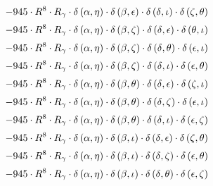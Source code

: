 \begin{subequations}
\begin{gather}
 \\[0.2em] \notag 		 - 945 \cdot R^{8} \cdot R_{\gamma{}} \cdot \delta{}\left(\alpha{}, \eta{}\right) \cdot \delta{}\left(\beta{}, \epsilon{}\right) \cdot \delta{}\left(\delta{}, \iota{}\right) \cdot \delta{}\left(\zeta{}, \theta{}\right) 
 \\[0.2em] \notag 		 - 945 \cdot R^{8} \cdot R_{\gamma{}} \cdot \delta{}\left(\alpha{}, \eta{}\right) \cdot \delta{}\left(\beta{}, \zeta{}\right) \cdot \delta{}\left(\delta{}, \epsilon{}\right) \cdot \delta{}\left(\theta{}, \iota{}\right) 
 \\[0.2em] \notag 		 - 945 \cdot R^{8} \cdot R_{\gamma{}} \cdot \delta{}\left(\alpha{}, \eta{}\right) \cdot \delta{}\left(\beta{}, \zeta{}\right) \cdot \delta{}\left(\delta{}, \theta{}\right) \cdot \delta{}\left(\epsilon{}, \iota{}\right) 
 \\[0.2em] \notag 		 - 945 \cdot R^{8} \cdot R_{\gamma{}} \cdot \delta{}\left(\alpha{}, \eta{}\right) \cdot \delta{}\left(\beta{}, \zeta{}\right) \cdot \delta{}\left(\delta{}, \iota{}\right) \cdot \delta{}\left(\epsilon{}, \theta{}\right) 
 \\[0.2em] \notag 		 - 945 \cdot R^{8} \cdot R_{\gamma{}} \cdot \delta{}\left(\alpha{}, \eta{}\right) \cdot \delta{}\left(\beta{}, \theta{}\right) \cdot \delta{}\left(\delta{}, \epsilon{}\right) \cdot \delta{}\left(\zeta{}, \iota{}\right) 
 \\[0.2em] \notag 		 - 945 \cdot R^{8} \cdot R_{\gamma{}} \cdot \delta{}\left(\alpha{}, \eta{}\right) \cdot \delta{}\left(\beta{}, \theta{}\right) \cdot \delta{}\left(\delta{}, \zeta{}\right) \cdot \delta{}\left(\epsilon{}, \iota{}\right) 
 \\[0.2em] \notag 		 - 945 \cdot R^{8} \cdot R_{\gamma{}} \cdot \delta{}\left(\alpha{}, \eta{}\right) \cdot \delta{}\left(\beta{}, \theta{}\right) \cdot \delta{}\left(\delta{}, \iota{}\right) \cdot \delta{}\left(\epsilon{}, \zeta{}\right) 
 \\[0.2em] \notag 		 - 945 \cdot R^{8} \cdot R_{\gamma{}} \cdot \delta{}\left(\alpha{}, \eta{}\right) \cdot \delta{}\left(\beta{}, \iota{}\right) \cdot \delta{}\left(\delta{}, \epsilon{}\right) \cdot \delta{}\left(\zeta{}, \theta{}\right) 
 \\[0.2em] \notag 		 - 945 \cdot R^{8} \cdot R_{\gamma{}} \cdot \delta{}\left(\alpha{}, \eta{}\right) \cdot \delta{}\left(\beta{}, \iota{}\right) \cdot \delta{}\left(\delta{}, \zeta{}\right) \cdot \delta{}\left(\epsilon{}, \theta{}\right) 
 \\[0.2em] \notag 		 - 945 \cdot R^{8} \cdot R_{\gamma{}} \cdot \delta{}\left(\alpha{}, \eta{}\right) \cdot \delta{}\left(\beta{}, \iota{}\right) \cdot \delta{}\left(\delta{}, \theta{}\right) \cdot \delta{}\left(\epsilon{}, \zeta{}\right) 

\end{gather}
\end{subequations}
